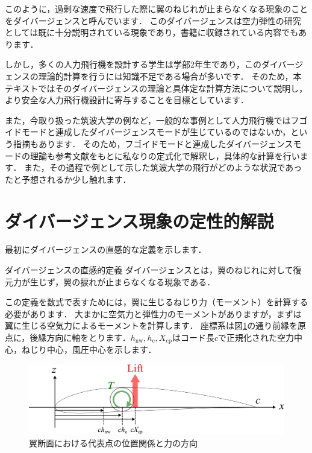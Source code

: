 \documentclass{jarticle}
\begin{document}
このように，過剰な速度で飛行した際に翼のねじれが止まらなくなる現象のことをダイバージェンスと呼んでいます．
このダイバージェンスは空力弾性の研究としては既に十分説明されている現象であり，書籍に収録されている内容でもあります\cite{2019}．

しかし，多くの人力飛行機を設計する学生は学部2年生であり，このダイバージェンスの理論的計算を行うには知識不足である場合が多いです．
そのため，本テキストではそのダイバージェンスの理論と具体定な計算方法について説明し，より安全な人力飛行機設計に寄与することを目標としています．

また，今取り扱った筑波大学の例など，一般的な事例として人力飛行機ではフゴイドモードと連成したダイバージェンスモード\cite{takasaki2}\cite{takasaki}が生じているのではないか，という指摘もあります．
そのため，フゴイドモードと連成したダイバージェンスモードの理論も参考文献をもとに私なりの定式化で解釈し，具体的な計算を行います．
また，その過程で例として示した筑波大学の飛行がどのような状況であったと予想されるか少し触れます．

\newpage

\tableofcontents

\newpage

\section{ダイバージェンス現象の定性的解説}

最初にダイバージェンスの直感的な定義を示します．
\begin{itembox}[l]{ダイバージェンスの直感的定義}
    ダイバージェンスとは，翼のねじれに対して復元力が生じず，翼の捩れが止まらなくなる現象である．
\end{itembox}

この定義を数式で表すためには，翼に生じるねじり力（モーメント）を計算する必要があります．
大まかに空気力と弾性力のモーメントがありますが，まずは翼に生じる空気力によるモーメントを計算します．
座標系は図\ref{chod}の通り前縁を原点に，後縁方向に軸をとります．$h_\mathrm{nw},h_\mathrm{e},X_\mathrm{cp}$はコード長$c$で正規化された空力中心，ねじり中心，風圧中心を示します．
\begin{figure}[H]
    \centering
    \includegraphics[width=0.7\linewidth]{image/airfoil.pdf}
    \caption{翼断面における代表点の位置関係と力の方向}
    \label{chod}
\end{figure}
\end{document}

